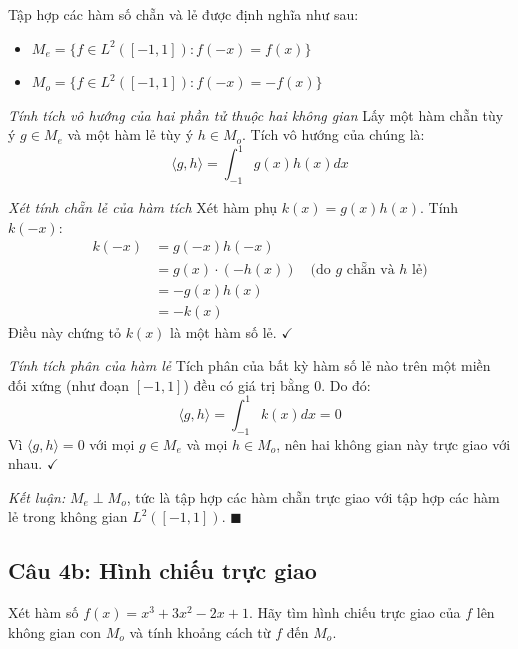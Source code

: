\begin{solution}
Tập hợp các hàm số chẵn và lẻ được định nghĩa như sau:
\begin{itemize}
    \item $M_e = \{f \in L^2([-1,1]) : f(-x) = f(x)\}$
    \item $M_o = \{f \in L^2([-1,1]) : f(-x) = -f(x)\}$
\end{itemize}

\textit{Tính tích vô hướng của hai phần tử thuộc hai không gian}
Lấy một hàm chẵn tùy ý $g \in M_e$ và một hàm lẻ tùy ý $h \in M_o$. Tích vô hướng của chúng là:
\[ 
    \langle g, h \rangle = \int_{-1}^1 g(x)h(x) dx 
\]

\textit{Xét tính chẵn lẻ của hàm tích}
Xét hàm phụ $k(x) = g(x)h(x)$. Tính $k(-x)$:
\begin{align*}
    k(-x) &= g(-x)h(-x) \\
    &= g(x) \cdot (-h(x)) \quad \text{(do $g$ chẵn và $h$ lẻ)} \\
    &= -g(x)h(x) \\
    &= -k(x)
\end{align*}
Điều này chứng tỏ $k(x)$ là một hàm số lẻ. $\checkmark$

\textit{Tính tích phân của hàm lẻ}
Tích phân của bất kỳ hàm số lẻ nào trên một miền đối xứng (như đoạn $[-1, 1]$) đều có giá trị bằng 0. Do đó:
\[
    \langle g, h \rangle = \int_{-1}^1 k(x) dx = 0
\]
Vì $\langle g, h \rangle = 0$ với mọi $g \in M_e$ và mọi $h \in M_o$, nên hai không gian này trực giao với nhau. $\checkmark$

\textit{Kết luận:} $M_e \perp M_o$, tức là tập hợp các hàm chẵn trực giao với tập hợp các hàm lẻ trong không gian $L^2([-1, 1])$. $\blacksquare$
\end{solution}

\subsection*{Câu 4b: Hình chiếu trực giao}

\begin{questionbox}
Xét hàm số $f(x) = x^3 + 3x^2 - 2x + 1$. Hãy tìm hình chiếu trực giao của $f$ lên không gian con $M_o$ và tính khoảng cách từ $f$ đến $M_o$.
\end{questionbox}

